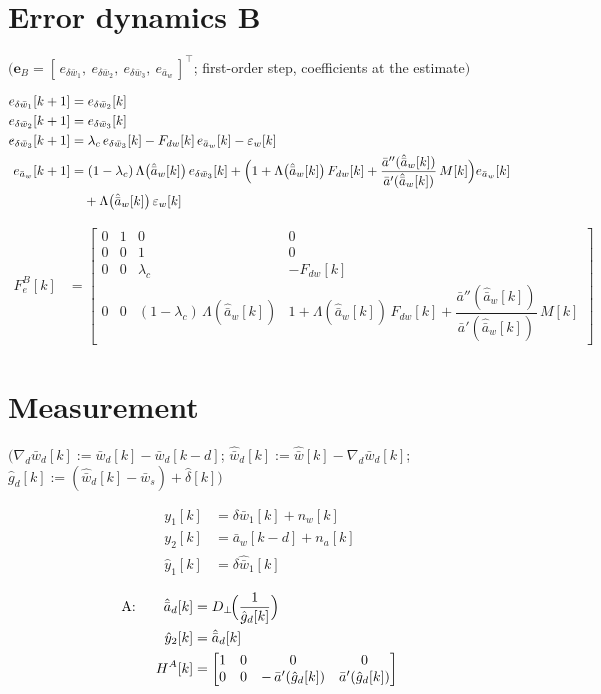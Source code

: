 \documentclass[11pt,a4paper,fontset=none]{ctexart}
\newcommand{\ba}{\bar{a}}
\newcommand{\bw}{\bar{w}}
\newcommand{\ap}{\ba'}
\newcommand{\app}{\ba''}
\newcommand{\ah}{\hat{\ba}_w}
\newcommand{\wh}{\hat{\bw}}
\newcommand{\ad}{\hat{\ba}_d}
\newcommand{\Dp}{D_{\perp}}
\newcommand{\dlh}{\hat{\delta}}
\newcommand{\gh}{\hat{g}}
\newcommand{\lam}{\Lambda}
\begin{document}
\section{Error dynamics B}

$\bigl(\mathbf{e}_B = [\,e_{\delta\bw_1},\ e_{\delta\bw_2},\ e_{\delta\bw_3},\ e_{\ba_w}\,]^{\top}$; first-order step, coefficients at the estimate$\bigr)$

\begin{align*}
e_{\delta\bw_1}[k+1] &= e_{\delta\bw_2}[k] \\
e_{\delta\bw_2}[k+1] &= e_{\delta\bw_3}[k] \\
e_{\delta\bw_3}[k+1] &= \lambda_c\,e_{\delta\bw_3}[k] - F_{dw}[k]\,e_{\ba_w}[k] - \varepsilon_w[k] \\
e_{\ba_w}[k+1]       &= (1-\lambda_c)\,\lam\bigl(\ah[k]\bigr)\,e_{\delta\bw_3}[k]
                        + \Bigl(1 + \lam\bigl(\ah[k]\bigr)\,F_{dw}[k] + \frac{\app(\ah[k])}{\ap(\ah[k])}\,M[k]\Bigr)e_{\ba_w}[k] \\
                     &\quad + \lam\bigl(\ah[k]\bigr)\,\varepsilon_w[k]
\end{align*}

\begin{align*}
F_e^{B}[k] &= \begin{bmatrix}
0 & 1 & 0 & 0 \\
0 & 0 & 1 & 0 \\
0 & 0 & \lambda_c & -F_{dw}[k] \\
0 & 0 & (1-\lambda_c)\,\lam(\ah[k]) & 1 + \lam(\ah[k])\,F_{dw}[k] + \dfrac{\app(\ah[k])}{\ap(\ah[k])}\,M[k]
\end{bmatrix}
\end{align*}

\section{Measurement}

$\bigl(\nabla_d\bw_d[k] := \bw_d[k] - \bw_d[k-d]$; $\wh_d[k] := \wh[k] - \nabla_d\bw_d[k]$; $\gh_d[k] := (\wh_d[k] - \bw_s) + \dlh[k]\bigr)$

\begin{align*}
y_1[k]      &= \delta\bw_1[k] + n_w[k] \\
y_2[k]      &= \ba_w[k-d] + n_a[k] \\
\hat y_1[k] &= \delta\hat{\bw}_1[k]
\end{align*}

\begin{align*}
\text{A:}\qquad
\ad[k]      &= \Dp\!\Bigl(\frac{1}{\gh_d[k]}\Bigr) \\
\hat y_2[k] &= \ad[k] \\
H^{A}[k]    &= \begin{bmatrix} 1 & 0 & 0 & 0 \\
               0 & 0 & -\,\ap(\gh_d[k]) & \ap(\gh_d[k]) \end{bmatrix}
\end{align*}
\end{document}
